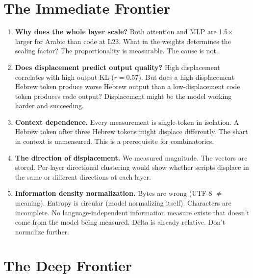 \documentclass[11pt,a4paper]{article}
\begin{document}
\section{The Immediate Frontier}

\begin{enumerate}[nosep]
\item \textbf{Why does the whole layer scale?} Both attention and MLP are 1.5$\times$ larger for Arabic than code at L23. What in the weights determines the scaling factor? The proportionality is measurable. The cause is not.

\item \textbf{Does displacement predict output quality?} High displacement correlates with high output KL ($r = 0.57$). But does a high-displacement Hebrew token produce worse Hebrew output than a low-displacement code token produces code output? Displacement might be the model working harder and succeeding.

\item \textbf{Context dependence.} Every measurement is single-token in isolation. A Hebrew token after three Hebrew tokens might displace differently. The shart in context is unmeasured. This is a prerequisite for combinatorics.

\item \textbf{The direction of displacement.} We measured magnitude. The vectors are stored. Per-layer directional clustering would show whether scripts displace in the same or different directions at each layer.

\item \textbf{Information density normalization.} Bytes are wrong (UTF-8 $\neq$ meaning). Entropy is circular (model normalizing itself). Characters are incomplete. No language-independent information measure exists that doesn't come from the model being measured. Delta is already relative. Don't normalize further.
\end{enumerate}

\section{The Deep Frontier}
\end{document}
